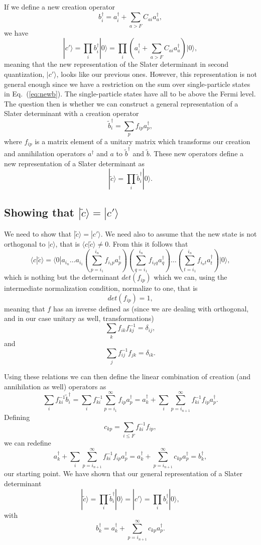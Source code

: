 \documentclass[%
oneside,                 %
final,                   %
10pt]{article}
\begin{document}
If we define a new creation operator 
\begin{equation}
b^{\dagger}_{i}=a^{\dagger}_{i}+\sum_{a>F}C_{ai}a_{a}^{\dagger}, \label{eq:newb}
\end{equation}
we have 
\[
|c'\rangle=\prod_{i}b^{\dagger}_{i}|0\rangle=\prod_{i}\left(a^{\dagger}_{i}+\sum_{a>F}C_{ai}a_{a}^{\dagger}\right)|0\rangle,
\]
meaning that the new representation of the Slater determinant in second quantization, $|c'\rangle$, looks like our previous ones. However, this representation is not general enough since we have a restriction on the sum over single-particle states in Eq.~(\ref{eq:newb}). The single-particle states have all to be above the Fermi level.
The question then is whether we can construct a general representation of a Slater determinant with a creation operator 
\[
\tilde{b}^{\dagger}_{i}=\sum_{p}f_{ip}a_{p}^{\dagger},
\]
where $f_{ip}$ is a matrix element of a unitary matrix which transforms our creation and annihilation operators
$a^{\dagger}$ and $a$ to $\tilde{b}^{\dagger}$ and $\tilde{b}$. These new operators define a new representation of a Slater determinant as
\[
|\tilde{c}\rangle=\prod_{i}\tilde{b}^{\dagger}_{i}|0\rangle.
\]

\subsection*{Showing that $|\tilde{c}\rangle= |c'\rangle$}

We need to show that $|\tilde{c}\rangle= |c'\rangle$. We need also to assume that the new state
is not orthogonal to $|c\rangle$, that is $\langle c| \tilde{c}\rangle \ne 0$. From this it follows that 
\[
\langle c| \tilde{c}\rangle=\langle 0| a_{i_n}\dots a_{i_1}\left(\sum_{p=i_1}^{i_n}f_{i_1p}a_{p}^{\dagger} \right)\left(\sum_{q=i_1}^{i_n}f_{i_2q}a_{q}^{\dagger} \right)\dots \left(\sum_{t=i_1}^{i_n}f_{i_nt}a_{t}^{\dagger} \right)|0\rangle,
\]
which is nothing but the determinant $det(f_{ip})$ which we can, using the intermediate normalization condition, 
normalize to one, that is
\[
det(f_{ip})=1,
\]
meaning that $f$ has an inverse defined as (since we are dealing with orthogonal, and in our case unitary as well, transformations)
\[
\sum_{k} f_{ik}f^{-1}_{kj} = \delta_{ij},
\]
and 
\[
\sum_{j} f^{-1}_{ij}f_{jk} = \delta_{ik}.
\]

Using these relations we can then define the linear combination of creation (and annihilation as well) 
operators as
\[
\sum_{i}f^{-1}_{ki}\tilde{b}^{\dagger}_{i}=\sum_{i}f^{-1}_{ki}\sum_{p=i_1}^{\infty}f_{ip}a_{p}^{\dagger}=a_{k}^{\dagger}+\sum_{i}\sum_{p=i_{n+1}}^{\infty}f^{-1}_{ki}f_{ip}a_{p}^{\dagger}.
\]
Defining 
\[
c_{kp}=\sum_{i \le F}f^{-1}_{ki}f_{ip},
\]
we can redefine 
\[
a_{k}^{\dagger}+\sum_{i}\sum_{p=i_{n+1}}^{\infty}f^{-1}_{ki}f_{ip}a_{p}^{\dagger}=a_{k}^{\dagger}+\sum_{p=i_{n+1}}^{\infty}c_{kp}a_{p}^{\dagger}=b_k^{\dagger},
\]
our starting point. We have shown that our general representation of a Slater determinant 
\[
|\tilde{c}\rangle=\prod_{i}\tilde{b}^{\dagger}_{i}|0\rangle=|c'\rangle=\prod_{i}b^{\dagger}_{i}|0\rangle,
\]
with 
\[
b_k^{\dagger}=a_{k}^{\dagger}+\sum_{p=i_{n+1}}^{\infty}c_{kp}a_{p}^{\dagger}.
\]
\end{document}
